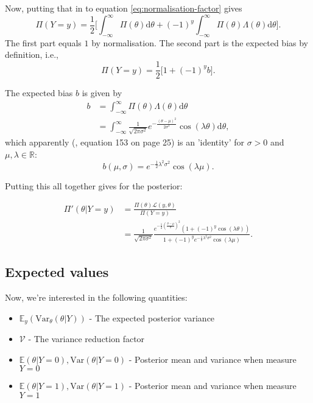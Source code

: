 \documentclass[]{report}
\begin{document}
Now, putting that in to equation \eqref{eq:normalisation-factor} gives
\begin{equation}
    \Pi(Y=y) = \frac{1}{2} \Big[ \int_{-\infty}^{\infty} \Pi(\theta) \text{d}\theta + (-1)^y \int_{-\infty}^{\infty} \Pi(\theta) \Lambda (\theta) \text{d} \theta \Big].
\end{equation}
The first part equals $1$ by normalisation. The second part is the expected bias by definition, i.e.,
\begin{equation}
     \Pi(Y=y) = \frac{1}{2} \Big[ 1 + (-1)^y b\Big].
\end{equation}

The expected bias $b$ is given by
\begin{align}
    b   &= \int_{-\infty}^{\infty} \Pi(\theta) \Lambda (\theta) \text{d} \theta\\
        &= \int_{-\infty}^{\infty} \frac{1}{\sqrt{2\pi \sigma^2}} e^{-\frac{(\theta - \mu)^2}{2\sigma^2}} \cos(\lambda \theta) \text{d} \theta,
\end{align}
which apparently (\cite{Koh2020}, equation 153 on page 25) is an 'identity' for $\sigma > 0$ and $\mu, \lambda \in \mathbb{R}$:
\begin{equation}
\label{eq:b-gaussian}
    b(\mu, \sigma) = e^{-\frac{1}{2}\lambda^2\sigma^2} \cos (\lambda \mu).
\end{equation}


Putting this all together gives for the posterior:

\begin{align}
    \Pi'(\theta|Y = y)  &= \frac{\Pi(\theta) \mathcal{L} (y, \theta)}{\Pi(Y=y)}\\
    &= \frac{1}{\sqrt{2\pi \sigma^2}}\frac{e^{-\frac{1}{2}(\frac{\theta - \mu}{\sigma})^2} ( 1 + (-1)^y \cos(\lambda \theta))}{1 + (-1)^y e^{-\frac{1}{2}\lambda^2\sigma^2} \cos (\lambda \mu)}.
\end{align}

\subsection{Expected values}
Now, we're interested in the following quantities:
\begin{itemize}
    \item $\mathbb{E}_y(\text{Var}_{\theta}(\theta | Y))$ - The expected posterior variance
    \item $\mathcal{V}$ - The variance reduction factor
    \item $\mathbb{E}(\theta | Y=0), \text{Var}(\theta|Y=0)$ - Posterior mean and variance when measure $Y=0$
    \item $\mathbb{E}(\theta | Y=1), \text{Var}(\theta|Y=1)$ - Posterior mean and variance when measure $Y=1$
\end{itemize}
\end{document}
